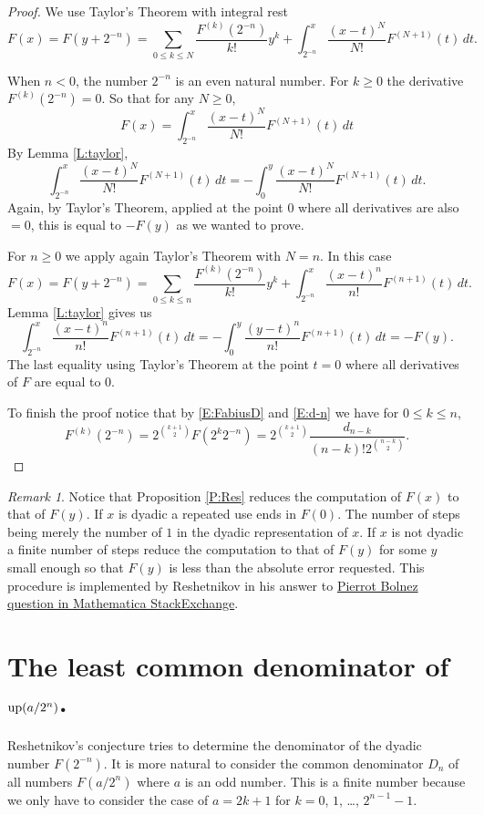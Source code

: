 \documentclass[10pt]{amsart}
\theoremstyle{definition}
\theoremstyle{remark}
\newtheorem{rem}[thm]{Remark}
\begin{document}
\begin{proof}
We use Taylor's Theorem with integral rest
\[F(x)=F(y+2^{-n})=\sum_{0\le k\le N}\frac{F^{(k)}(2^{-n})}{k!}y^k+\int_{2^{-n}}^x\frac{(x-t)^N}{N!} F^{(N+1)}(t)\,dt.\]

When $n<0$, the number $2^{-n}$ is an even natural number. For $k\ge0$ the derivative $F^{(k)}(2^{-n})=0$. So that for
any $N\ge0$,
\[F(x)=\int_{2^{-n}}^x\frac{(x-t)^N}{N!} F^{(N+1)}(t)\,dt\]
By Lemma \eqref{L:taylor},
\[\int_{2^{-n}}^x\frac{(x-t)^N}{N!} F^{(N+1)}(t)\,dt=-\int_{0}^y\frac{(x-t)^N}{N!} F^{(N+1)}(t)\,dt.\]
Again, by Taylor's Theorem, applied at the point $0$ where all derivatives are also $=0$,
this is equal to $-F(y)$ as we wanted to prove.

For $n\ge0$ we apply again Taylor's Theorem with $N=n$.  In this case
\[F(x)=F(y+2^{-n})=\sum_{0\le k\le n}\frac{F^{(k)}(2^{-n})}{k!}y^k+\int_{2^{-n}}^x\frac{(x-t)^n}{n!} F^{(n+1)}(t)\,dt.\]
Lemma \eqref{L:taylor} gives us
\[\int_{2^{-n}}^x\frac{(x-t)^n}{n!} F^{(n+1)}(t)\,dt=-\int_0^y \frac{(y-t)^n}{n!} F^{(n+1)}(t)\,dt=-F(y).\]
The last equality using Taylor's Theorem at the point $t=0$ where all derivatives of $F$ are equal to $0$.

To finish the proof notice that by \eqref{E:FabiusD} and \eqref{E:d-n} we have for $0\le k\le n$,
\[F^{(k)}(2^{-n})=2^{\binom{k+1}{2}}F(2^k 2^{-n})=2^{\binom{k+1}{2}}\frac{d_{n-k}}{(n-k)! 2^{\binom{n-k}{2}}}.\]
\end{proof}

\begin{rem}
Notice that  Proposition \ref{P:Res} reduces the computation of $F(x)$  to that of $F(y)$.
If $x$ is dyadic a repeated use ends in $F(0)$. The number of steps being merely the number of $1$
in the  dyadic representation of $x$.  If $x$ is not dyadic a finite number of steps reduce the computation to that
of  $F(y)$ for some $y$ small enough so that  $F(y)$ is less than the absolute error requested.
This procedure is implemented by Reshetnikov in his answer to \href{http://mathematica.stackexchange.com/questions/120331/how-do-i-numerically-evaluate-and-plot-the-fabius-function}{Pierrot Bolnez question in Mathematica StackExchange}.
\end{rem}

\section{The least common denominator of $\operatorname{up}(a/2^n)$.}

Reshetnikov's conjecture tries to determine the denominator of the dyadic number $F(2^{-n})$.  It is more natural to
consider the common denominator $D_n$ of all numbers $F(a/2^n)$ where $a$ is an odd number. This is a finite number
because we only have to consider the case of $a=2k+1$ for $k=0$, $1$, \dots, $2^{n-1}-1$.
\end{document}
